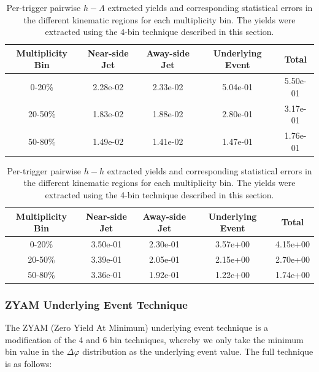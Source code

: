 \documentclass[ALICE,manyauthors]{ALICE_analysis_notes}
\begin{document}
\begin{table}[h!]
\centering
\begin{tabular}{| c | c | c | c | c | }
\hline
Multiplicity Bin & Near-side Jet & Away-side Jet & Underlying Event & Total  \\
\hline

0-20\% & 2.28e-02  & 2.33e-02  & 5.04e-01 & 5.50e-01 \\
20-50\% & 1.83e-02 & 1.88e-02  & 2.80e-01 & 3.17e-01 \\
50-80\% & 1.49e-02 & 1.41e-02  & 1.47e-01 & 1.76e-01 \\
	
\hline
\end{tabular}
\caption{Per-trigger pairwise $h-\Lambda$ extracted yields and corresponding statistical errors in the different kinematic regions for each multiplicity bin. The yields were extracted using the 4-bin technique described in this section.}
\label{h_lambda_yield_table_4bin}
\end{table}
	
\begin{table}[h!]
\centering
\begin{tabular}{| c | c | c | c | c | }
\hline
Multiplicity Bin & Near-side Jet & Away-side Jet & Underlying Event & Total  \\
\hline

0-20\% & 3.50e-01  & 2.30e-01  & 3.57e+00 & 4.15e+00 \\
20-50\% & 3.39e-01 & 2.05e-01  & 2.15e+00 & 2.70e+00 \\
50-80\% & 3.36e-01 & 1.92e-01  & 1.22e+00 & 1.74e+00 \\

\hline
\end{tabular}
\caption{Per-trigger pairwise $h-h$ extracted yields and corresponding statistical errors in the different kinematic regions for each multiplicity bin. The yields were extracted using the 4-bin technique described in this section.}
\label{h_h_yield_table_4bin}
\end{table}

\subsubsection{ZYAM Underlying Event Technique}
\label{zyam}
The ZYAM (Zero Yield At Minimum) underlying event technique is a modification of the 4 and 6 bin techniques, whereby we only take the minimum bin value in the $\Delta\varphi$ distribution as the underlying event value. The full technique is as follows:
\end{document}
